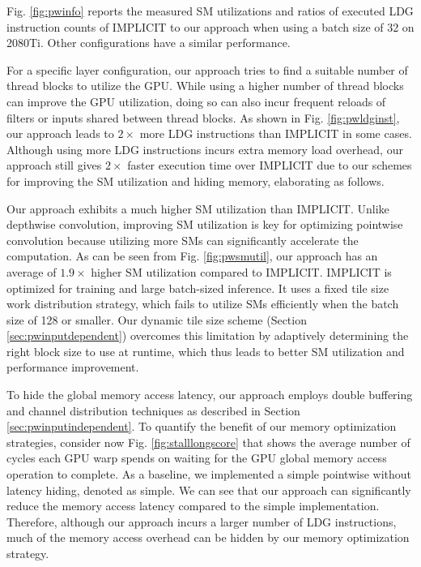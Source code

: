Fig. \ref{fig:pwinfo} reports the measured SM utilizations and ratios of executed LDG instruction counts of IMPLICIT to our approach when using a batch size of 32 on 2080Ti. Other configurations have a similar performance.


For a specific layer configuration, our approach tries to find a suitable number of thread blocks to utilize the GPU. While using a higher
number of thread blocks can improve the GPU utilization, doing so can also incur frequent reloads of filters or inputs shared between
thread blocks. As shown in Fig. \ref{fig:pwldginst}, our approach leads to $2\times$ more LDG instructions than IMPLICIT in some
cases. Although using more LDG instructions incurs extra memory load overhead, our approach still gives $2\times$ faster execution time
over IMPLICIT due to our schemes for improving the SM utilization and hiding memory, elaborating as follows.


Our approach exhibits a much higher SM utilization than IMPLICIT. Unlike depthwise convolution, improving SM utilization is key for
optimizing pointwise convolution because utilizing more SMs can significantly accelerate the computation.	As can be seen from Fig.
\ref{fig:pwsmutil}, our approach has an average of $1.9\times$ higher SM utilization compared to IMPLICIT. IMPLICIT is
optimized for training and large batch-sized inference. It uses a fixed tile size work distribution strategy, which fails to utilize SMs
efficiently when the batch size of 128 or smaller. Our dynamic tile size scheme (Section \ref{sec:pwinputdependent}) overcomes this
limitation by adaptively determining the right block size to use at runtime, which thus leads to better SM utilization and performance
improvement.

To hide the global memory access latency, our approach employs double buffering and channel distribution techniques as described in
Section \ref{sec:pwinputindependent}. To quantify the benefit of our memory optimization strategies, consider now  Fig. \ref{fig:stalllongscore} that
shows the average number of cycles each GPU warp spends on waiting for the GPU global memory access operation to complete. As a baseline,
we implemented a simple pointwise without latency hiding, denoted as simple. We can see that our approach can significantly reduce the
memory access latency compared to the simple implementation. Therefore, although our approach incurs a larger number of LDG instructions,
much of the memory access overhead can be hidden by our memory optimization strategy.



